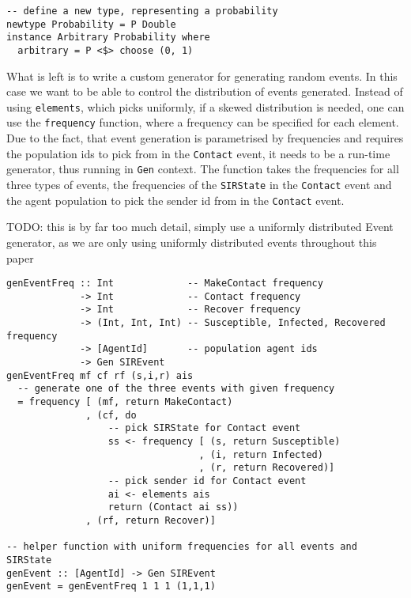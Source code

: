 \begin{footnotesize}
\begin{verbatim}
-- define a new type, representing a probability
newtype Probability = P Double
instance Arbitrary Probability where
  arbitrary = P <$> choose (0, 1)
\end{verbatim}
\end{footnotesize}

What is left is to write a custom generator for generating random events. In this case we want to be able to control the distribution of events generated. Instead of using \texttt{elements}, which picks uniformly, if a skewed distribution is needed, one can use the \texttt{frequency} function, where a frequency can be specified for each element. Due to the fact, that event generation is parametrised by frequencies and requires the population ids to pick from in the \texttt{Contact} event, it needs to be a run-time generator, thus running in \texttt{Gen} context. The function takes the frequencies for all three types of events, the frequencies of the \texttt{SIRState} in the \texttt{Contact} event and the agent population to pick the sender id from in the \texttt{Contact} event.

TODO: this is by far too much detail, simply use a uniformly distributed Event generator, as we are only using uniformly distributed events throughout this paper

\begin{footnotesize}
\begin{verbatim}
genEventFreq :: Int             -- MakeContact frequency
             -> Int             -- Contact frequency
             -> Int             -- Recover frequency
             -> (Int, Int, Int) -- Susceptible, Infected, Recovered frequency
             -> [AgentId]       -- population agent ids
             -> Gen SIREvent
genEventFreq mf cf rf (s,i,r) ais
  -- generate one of the three events with given frequency
  = frequency [ (mf, return MakeContact)
              , (cf, do
                  -- pick SIRState for Contact event
                  ss <- frequency [ (s, return Susceptible)
                                  , (i, return Infected)
                                  , (r, return Recovered)]
                  -- pick sender id for Contact event
                  ai <- elements ais
                  return (Contact ai ss))
              , (rf, return Recover)]
         
-- helper function with uniform frequencies for all events and SIRState
genEvent :: [AgentId] -> Gen SIREvent
genEvent = genEventFreq 1 1 1 (1,1,1) 
\end{verbatim}
\end{footnotesize}

